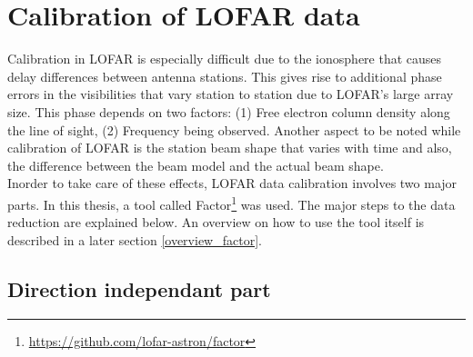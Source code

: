 \documentclass[../main/thesis_msc.tex]{subfiles}
\begin{document}

\newpage
\section{Calibration of LOFAR data}
Calibration in LOFAR is especially difficult due to the ionosphere that causes delay differences between antenna stations. This gives rise to additional phase errors in the visibilities that vary station to station due to LOFAR's large array size. This phase depends on two factors: (1) Free electron column density along the line of sight, (2) Frequency being observed. Another aspect to be noted while calibration of LOFAR is the station beam shape that varies with time and also, the difference between the beam model and the actual beam shape.\\
Inorder to take care of these effects, LOFAR data calibration involves two major parts. In this thesis, a tool called Factor\footnote{\url{https://github.com/lofar-astron/factor}} was used. The major steps to the data reduction are explained below. An overview on how to use the tool itself is described in a later section \ref{overview_factor}.

\subsection{Direction independant part}
\end{document}
